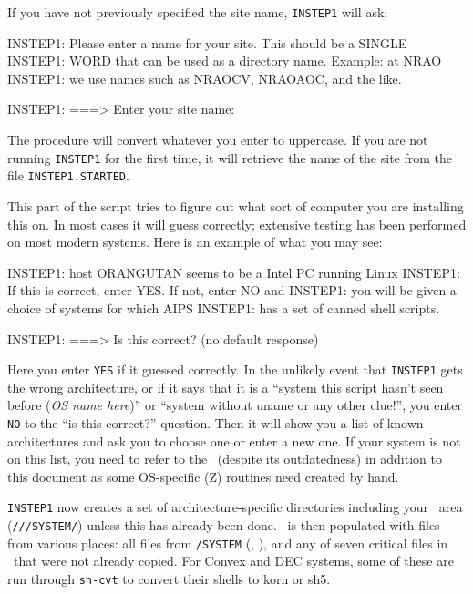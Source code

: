 If you have not previously specified the site name, {\tt INSTEP1} will
ask:\medskip

\fortran
INSTEP1: Please enter a name for your site.  This should be a SINGLE
INSTEP1: WORD that can be used as a directory name.  Example: at NRAO
INSTEP1: we use names such as NRAOCV, NRAOAOC, and the like.

INSTEP1: ===> Enter your site name:
\endfortran
\medskip

\noindent The procedure will convert whatever you enter to uppercase.
If you are not running {\tt INSTEP1} for the first time, it will
retrieve the name of the site from the file {\tt INSTEP1.STARTED}.

\medskip{}

This part of the script tries to figure out what sort of computer you
are installing this on.  In most cases it will guess correctly;
extensive testing has been performed on most modern systems.  Here is an
example of what you may see:\medskip

\fortran
INSTEP1: host ORANGUTAN seems to be a Intel PC running Linux
INSTEP1: If this is correct, enter YES.  If not, enter NO and
INSTEP1: you will be given a choice of systems for which AIPS
INSTEP1: has a set of canned shell scripts.

INSTEP1: ===> Is this correct? (no default response)
\endfortran
\medskip

\noindent Here you enter {\tt YES} if it guessed correctly.  In the
unlikely event that {\tt INSTEP1} gets the wrong architecture, or if it
says that it is a ``system this script hasn't seen before ({\it OS name
here\/})'' or ``system without uname or any other clue!'', you enter
{\tt NO} to the ``is this correct?'' question.  Then it will show you a
list of known architectures and ask you to choose one or enter a new
one.  If your system is not on this list, you need to refer to the
\BOH\ (despite its outdatedness) in addition to this document as some
OS-specific (Z) routines need created by hand.

{\tt INSTEP1} now creates a set of architecture-specific directories
including your \SYSL\ area ({\tt\AROOT/\THISVER/\ARCH/SYS\-TEM/\SITE})
unless this has already been done.  \SYSL\ is then populated with files
from various places: all files from {\tt\ARCH/\-SYS\-TEM} (\eg,
\SYSIBM), and any of seven critical files in \SYSU\ that were not
already copied.  For Convex and DEC systems, some of these are run
through {\tt sh-cvt} to convert their shells to korn or sh5.

